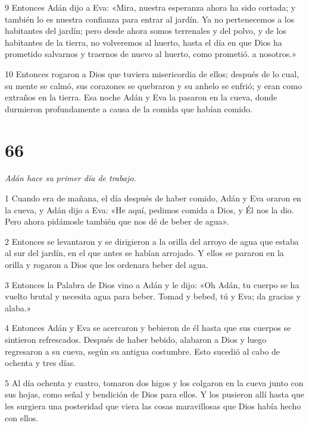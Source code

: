 \par 9 Entonces Adán dijo a Eva: «Mira, nuestra esperanza ahora ha sido cortada; y también lo es nuestra confianza para entrar al jardín. Ya no pertenecemos a los habitantes del jardín; pero desde ahora somos terrenales y del polvo, y de los habitantes de la tierra, no volveremos al huerto, hasta el día en que Dios ha prometido salvarnos y traernos de nuevo al huerto, como prometió. a nosotros.»

\par 10 Entonces rogaron a Dios que tuviera misericordia de ellos; después de lo cual, su mente se calmó, sus corazones se quebraron y su anhelo se enfrió; y eran como extraños en la tierra. Esa noche Adán y Eva la pasaron en la cueva, donde durmieron profundamente a causa de la comida que habían comido.

\chapter{66}

\par \textit{Adán hace su primer día de trabajo.}

\par 1 Cuando era de mañana, el día después de haber comido, Adán y Eva oraron en la cueva, y Adán dijo a Eva: «He aquí, pedimos comida a Dios, y Él nos la dio. Pero ahora pidámosle también que nos dé de beber de agua».

\par 2 Entonces se levantaron y se dirigieron a la orilla del arroyo de agua que estaba al sur del jardín, en el que antes se habían arrojado. Y ellos se pararon en la orilla y rogaron a Dios que les ordenara beber del agua.

\par 3 Entonces la Palabra de Dios vino a Adán y le dijo: «Oh Adán, tu cuerpo se ha vuelto brutal y necesita agua para beber. Tomad y bebed, tú y Eva; da gracias y alaba.»

\par 4 Entonces Adán y Eva se acercaron y bebieron de él hasta que sus cuerpos se sintieron refrescados. Después de haber bebido, alabaron a Dios y luego regresaron a su cueva, según su antigua costumbre. Esto sucedió al cabo de ochenta y tres días.

\par 5 Al día ochenta y cuatro, tomaron dos higos y los colgaron en la cueva junto con sus hojas, como señal y bendición de Dios para ellos. Y los pusieron allí hasta que les surgiera una posteridad que viera las cosas maravillosas que Dios había hecho con ellos.

